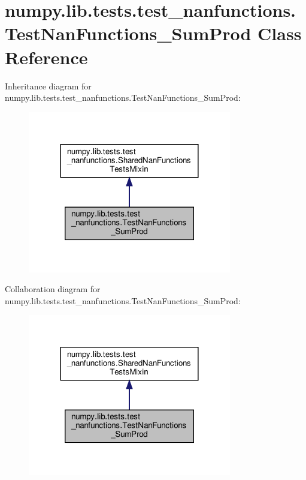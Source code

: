 \hypertarget{classnumpy_1_1lib_1_1tests_1_1test__nanfunctions_1_1TestNanFunctions__SumProd}{}\section{numpy.\+lib.\+tests.\+test\+\_\+nanfunctions.\+Test\+Nan\+Functions\+\_\+\+Sum\+Prod Class Reference}
\label{classnumpy_1_1lib_1_1tests_1_1test__nanfunctions_1_1TestNanFunctions__SumProd}


Inheritance diagram for numpy.\+lib.\+tests.\+test\+\_\+nanfunctions.\+Test\+Nan\+Functions\+\_\+\+Sum\+Prod\+:
\nopagebreak
\begin{figure}[H]
\begin{center}
\leavevmode
\includegraphics[width=252pt]{classnumpy_1_1lib_1_1tests_1_1test__nanfunctions_1_1TestNanFunctions__SumProd__inherit__graph}
\end{center}
\end{figure}


Collaboration diagram for numpy.\+lib.\+tests.\+test\+\_\+nanfunctions.\+Test\+Nan\+Functions\+\_\+\+Sum\+Prod\+:
\nopagebreak
\begin{figure}[H]
\begin{center}
\leavevmode
\includegraphics[width=252pt]{classnumpy_1_1lib_1_1tests_1_1test__nanfunctions_1_1TestNanFunctions__SumProd__coll__graph}
\end{center}
\end{figure}
